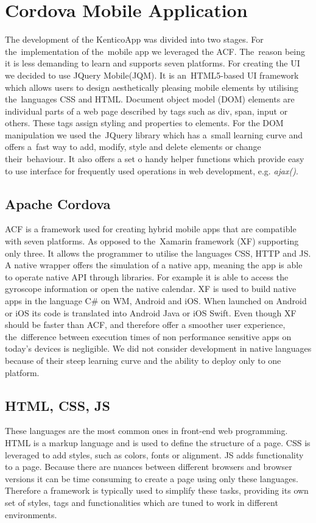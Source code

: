 \section{Cordova Mobile Application}
The development of the KenticoApp was divided into two stages. For the~implementation of the~mobile app we leveraged the ACF. The~reason being it is less demanding to learn and supports seven platforms. For creating the UI  we decided to use JQuery Mobile(JQM). It is an~HTML5-based UI framework which allows users to design aesthetically pleasing mobile elements by utilising the~languages CSS and HTML. Document object model (DOM) elements are individual parts of a web page described by tags such as div, span, input or others. These tags assign styling and properties to elements. For the DOM manipulation we used the~JQuery library which has a~small learning curve and offers a~fast way to add, modify, style and delete elements or change their~behaviour. It also offers a set o handy helper functions which provide easy to use interface for frequently used operations in web development, e.g. \textit{ajax()}.
\subsection{Apache Cordova}
 ACF is a framework used for creating hybrid mobile apps that are compatible with seven platforms. As opposed to the~Xamarin framework (XF) supporting only three. It allows the programmer to utilise the languages CSS, HTTP and JS. A native wrapper offers the simulation of a native app, meaning the app is able to operate native API through libraries. For example it is able to access the gyroscope information or open the native calendar. XF is used to build native apps in the language C\# on WM, Android and iOS. When launched on Android or iOS its code is translated into Android Java or iOS Swift. Even though XF should be faster than ACF, and therefore offer a smoother user experience, the~difference between execution times of non performance sensitive apps on today's devices is negligible. We did not consider development in native languages because of their steep learning curve and the ability to deploy only to one platform. 

\subsection{HTML, CSS, JS}
These languages are the most common ones in front-end web programming. HTML is a markup language and is used to define the structure of a page. CSS is leveraged to add styles, such as colors, fonts or alignment. JS adds functionality to a page. Because there are nuances between different browsers and browser versions it can be time consuming to create a page using only these languages. Therefore a framework is typically used to simplify these tasks, providing its own set of styles, tags and functionalities which are tuned to work in different environments.

